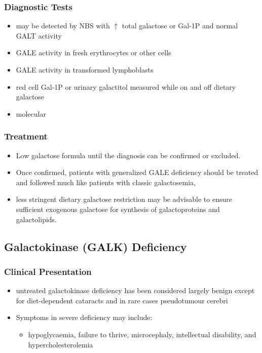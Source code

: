 \documentclass{scrartcl}
\begin{document}
\subsubsection{Diagnostic Tests}
\label{sec:org83c343e}
\begin{itemize}
\item may be detected by NBS with \(\uparrow\) total galactose or Gal-1P and normal GALT activity
\item GALE activity in fresh erythrocytes or other cells
\item GALE activity in transformed lymphoblasts
\item red cell Gal-1P or urinary galactitol measured while on and off dietary galactose
\item molecular
\end{itemize}

\subsubsection{Treatment}
\label{sec:orgcbfe931}
\begin{itemize}
\item Low galactose formula until the diagnosis can be confirmed or excluded.
\item Once confirmed, patients with generalized GALE deficiency should be
treated and followed much like patients with classic galactosemia,
\item less stringent dietary galactose restriction may be advisable to
ensure sufficient exogenous galactose for synthesis of galactoproteins and galactolipids.
\end{itemize}
\subsection{Galactokinase (GALK) Deficiency}
\label{sec:org9596032}
\subsubsection{Clinical Presentation}
\label{sec:org452a488}
\begin{itemize}
\item untreated galactokinase deficiency has been considered largely
benign except for diet-dependent cataracts and in rare cases pseudotumour cerebri
\item Symptoms in severe deficiency may include:
\begin{itemize}
\item hypoglycaemia, failure to thrive, microcephaly, intellectual
disability, and hypercholesterolemia
\end{itemize}
\end{itemize}
\end{document}
